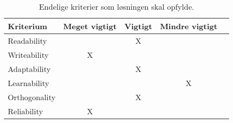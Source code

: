 \begin{table}[H]
\centering       
{}
\begin{tabular}{l c c c c}
\toprule
\textbf{Kriterium} & \textbf{Meget vigtigt} & \textbf{Vigtigt} & \textbf{Mindre vigtigt}  \\ \midrule
Readability        &   & X &       \\ 
Writeability       & X &   &       \\ 
Adaptability       &   & X &       \\ 
Learnability       &   &   & X     \\ 
Orthogonality      &   & X &       \\ 
Reliability        & X &   &       \\ \bottomrule
\end{tabular}
\caption{Endelige kriterier som løsningen skal opfylde.}
\label{table:kriterier}
\end{table}